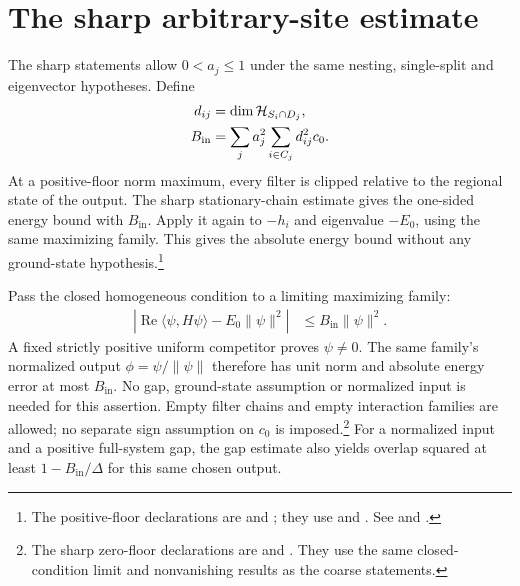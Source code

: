 \documentclass{article}
\begin{document}
\section{The sharp arbitrary-site estimate}

The sharp statements allow $0<a_j\le1$ under the same nesting,
single-split and eigenvector hypotheses. Define
\begin{align}
  d_{ij}&=\dim\mathcal H_{S_i\cap D_j},\notag\\
  B_{\mathrm{in}}&=\sum_j a_j^2\sum_{i\in C_j}d_{ij}^2c_0.
  \label{eq:zero_floor_inside_budget}
\end{align}
At a positive-floor norm maximum, every filter is clipped relative to
the regional state of the output. The sharp stationary-chain estimate
gives the one-sided energy bound with $B_{\mathrm{in}}$.
Apply it again to $-h_i$ and eigenvalue $-E_0$, using the same
maximizing family. This gives the absolute energy bound without any
ground-state hypothesis.\footnote{The positive-floor declarations are
 and
; they use
 and
. See
 and
.}

Pass the closed homogeneous condition to a limiting maximizing family:
\begin{align}
  |\operatorname{Re}\langle\psi,H\psi\rangle-E_0\|\psi\|^2|
    &\le B_{\mathrm{in}}\|\psi\|^2.
    \label{eq:zero_floor_sharp_homogeneous}
\end{align}
A fixed strictly positive uniform competitor proves $\psi\ne0$.
The same family's normalized output $\phi=\psi/\|\psi\|$ therefore has
unit norm and absolute energy error at most $B_{\mathrm{in}}$.
No gap, ground-state assumption or normalized input is needed for this
assertion. Empty filter chains and empty interaction families are
allowed; no separate sign assumption on $c_0$ is imposed.\footnote{The
sharp zero-floor declarations are
and
.
They use the same closed-condition limit and nonvanishing results as
the coarse statements.}
For a normalized input and a positive full-system gap, the gap estimate
also yields overlap squared at least $1-B_{\mathrm{in}}/\Delta$ for
this same chosen output.
\end{document}
